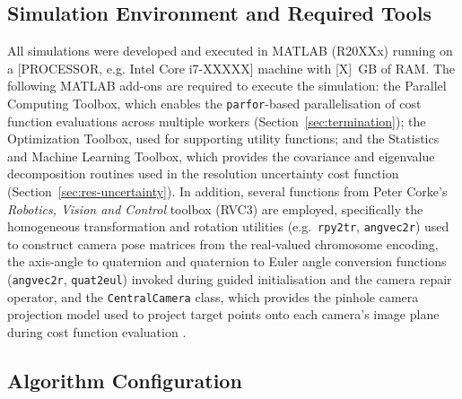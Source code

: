 \subsection{Simulation Environment and Required Tools}
\label{sec:sim-environment}

All simulations were developed and executed in MATLAB (R20XXx) running on a [PROCESSOR, e.g. Intel Core i7-XXXXX] machine with [X]~GB of RAM. The following MATLAB add-ons are required to execute the simulation: the Parallel Computing Toolbox, which enables the \texttt{parfor}-based parallelisation of cost function evaluations across multiple workers (Section~\ref{sec:termination}); the Optimization Toolbox, used for supporting utility functions; and the Statistics and Machine Learning Toolbox, which provides the covariance and eigenvalue decomposition routines used in the resolution uncertainty cost function (Section~\ref{sec:res-uncertainty}). In addition, several functions from Peter Corke's \textit{Robotics, Vision and Control} toolbox (RVC3) are employed, specifically the homogeneous transformation and rotation utilities (e.g.\ \texttt{rpy2tr}, \texttt{angvec2r}) used to construct camera pose matrices from the real-valued chromosome encoding, the axis-angle to quaternion and quaternion to Euler angle conversion functions (\texttt{angvec2r}, \texttt{quat2eul}) invoked during guided initialisation and the camera repair operator, and the \texttt{CentralCamera} class, which provides the pinhole camera projection model used to project target points onto each camera's image plane during cost function evaluation \parencite{corkeRoboticsVisionControl2023}.

\subsection{Algorithm Configuration}
\label{sec:algorithm-config}

